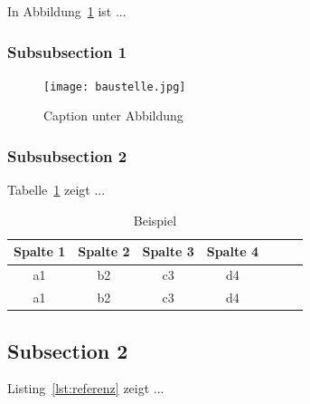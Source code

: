 \documentclass{article}
\begin{document}
In Abbildung~\ref{fig:example_figure} ist ...

\subsubsection{Subsubsection 1}
\label{subsubsec:label_abschnitt}

\begin{figure}[h] 
	\centering
	\texttt{[image: baustelle.jpg]}
	\caption[Caption für Abbildungsverzeichnis]{Caption unter Abbildung}
	\label{fig:example_figure}
\end{figure}


\subsubsection{Subsubsection 2}
\label{subsubsec:label_abschnitt2}


Tabelle~\ref{tab:example} zeigt ...

\begin{table}[h]
\renewcommand{\arraystretch}{1.0}
\centering
\begin{tabular}{ccccccc}
\hline
\textbf{Spalte 1} & \textbf{Spalte 2} & \textbf{Spalte 3} & \textbf{Spalte 4} \\
\hline
a1 & b2 & c3 & d4  \\ %
a1 & b2 & c3 & d4  \\ %
\hline
\end{tabular}
\caption{Beispiel}
\label{tab:example}
\end{table}



\subsection{Subsection 2}
\label{subsec:label_fuer_referenz_unterkapitel2}


Listing~\ref{lst:referenz} zeigt ...
\end{document}
